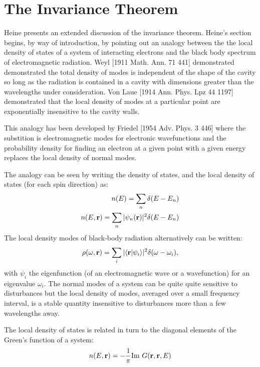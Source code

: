 %

\section{The Invariance Theorem}
\label{sec:invariance}
Heine presents an extended discussion of the invariance
theorem. Heine's section begins, by way of introduction, by pointing 
out an analogy between the the local density of states of a system of interacting
electrons and the black body spectrum of electromagnetic radiation.
Weyl [1911 Math. Ann. 71 441] demonstrated demonstrated the total density
of modes is independent of the shape of the cavity so long as the
radiation is contained in a cavity with dimensions greater than the wavelengths
under consideration. Von Laue [1914 Ann. Phys. Lpz 44 1197] demonstrated that the local density of modes at 
a particular point are exponentially insensitive to the cavity walls.

This analogy has been developed by Friedel [1954 Adv. Phys. 3 446] where
the substition is electromagnetic modes for electronic wavefunctions and
the probability density for finding an electron at a given point
with a given energy replaces the local density of normal modes.\cite{annett94}

The analogy can be seen by writing the density of states,
and the local density of states (for each spin direction) as:
%
\begin{eqnarray}
n(E) = \sum_{n}\delta(E-E_{n}) \\
n(E,{\bf r}) = \sum_{n} |\psi_{n}({\bf r})|^{2}\delta(E-E_{n})
\end{eqnarray}
%
The local density modes of black-body radiation alternatively can be written:
%
\begin{equation}
\rho(\omega,{\bf r})= \sum_{i} |\langle {\bf r}| \psi_{i}\rangle|^{2}\delta(\omega-\omega_{i}),
\end{equation}
%
with $\psi_{i}$ the eigenfunction (of an electromagnetic wave or a wavefunction) for an eigenvalue $\omega_{i}$.\cite{annett94}
The normal modes of a system can be quite quite sensitive to disturbances but the 
local density of modes, averaged over a small frequency interval, is a stable quantity 
insensitive to disturbances more than a few wavelengths away.

The local density of states is related in turn to the diagonal elements of
the Green's function of a system:
%
\begin{equation}
n(E,{\bf r}) = -\frac{1}{\pi}{\rm Im}~G({\bf r},{\bf r},E)
\end{equation}
%

